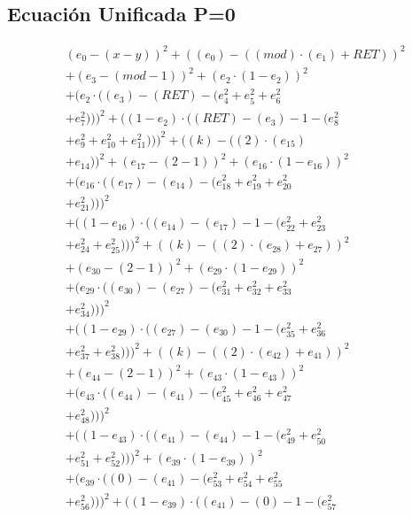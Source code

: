 \documentclass[10pt, a4paper]{article}
\begin{document}
\subsection*{Ecuación Unificada P=0}
\begin{align*}
& (e_{0} - (x - y))^{2} + ((e_{0}) - ((mod)  \cdot  (e_{1}) + RET))^{2} \\
& + (e_{3} - (mod - 1))^{2} + (e_{2}  \cdot  (1 - e_{2}))^{2} \\
& + (e_{2}  \cdot  ((e_{3}) - (RET) - (e_{4}^{2} + e_{5}^{2} + e_{6}^{2} \\
& + e_{7}^{2})))^{2} + ((1 - e_{2})  \cdot  ((RET) - (e_{3}) - 1 - (e_{8}^{2} \\
& + e_{9}^{2} + e_{10}^{2} + e_{11}^{2})))^{2} + ((k) - ((2)  \cdot  (e_{15}) \\
& + e_{14}))^{2} + (e_{17} - (2 - 1))^{2} + (e_{16}  \cdot  (1 - e_{16}))^{2} \\
& + (e_{16}  \cdot  ((e_{17}) - (e_{14}) - (e_{18}^{2} + e_{19}^{2} + e_{20}^{2} \\
& + e_{21}^{2})))^{2} \\
& + ((1 - e_{16})  \cdot  ((e_{14}) - (e_{17}) - 1 - (e_{22}^{2} + e_{23}^{2} \\
& + e_{24}^{2} + e_{25}^{2})))^{2} + ((k) - ((2)  \cdot  (e_{28}) + e_{27}))^{2} \\
& + (e_{30} - (2 - 1))^{2} + (e_{29}  \cdot  (1 - e_{29}))^{2} \\
& + (e_{29}  \cdot  ((e_{30}) - (e_{27}) - (e_{31}^{2} + e_{32}^{2} + e_{33}^{2} \\
& + e_{34}^{2})))^{2} \\
& + ((1 - e_{29})  \cdot  ((e_{27}) - (e_{30}) - 1 - (e_{35}^{2} + e_{36}^{2} \\
& + e_{37}^{2} + e_{38}^{2})))^{2} + ((k) - ((2)  \cdot  (e_{42}) + e_{41}))^{2} \\
& + (e_{44} - (2 - 1))^{2} + (e_{43}  \cdot  (1 - e_{43}))^{2} \\
& + (e_{43}  \cdot  ((e_{44}) - (e_{41}) - (e_{45}^{2} + e_{46}^{2} + e_{47}^{2} \\
& + e_{48}^{2})))^{2} \\
& + ((1 - e_{43})  \cdot  ((e_{41}) - (e_{44}) - 1 - (e_{49}^{2} + e_{50}^{2} \\
& + e_{51}^{2} + e_{52}^{2})))^{2} + (e_{39}  \cdot  (1 - e_{39}))^{2} \\
& + (e_{39}  \cdot  ((0) - (e_{41}) - (e_{53}^{2} + e_{54}^{2} + e_{55}^{2} \\
& + e_{56}^{2})))^{2} + ((1 - e_{39})  \cdot  ((e_{41}) - (0) - 1 - (e_{57}^{2} \\

\end{align*}
\end{document}
